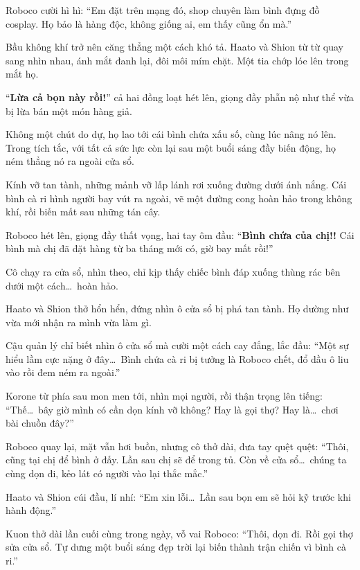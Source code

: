 \documentclass[../main.tex]{subfiles}
\begin{document}
Roboco cười hì hì: ``Em đặt trên mạng đó, shop chuyên làm bình đựng đồ cosplay. Họ bảo là hàng độc, không giống ai, em thấy cũng ổn mà.''

Bầu không khí trở nên căng thẳng một cách khó tả. Haato và Shion từ từ quay sang nhìn nhau, ánh mắt đanh lại, đôi môi mím chặt. Một tia chớp lóe lên trong mắt họ.

``\textbf{Lừa cả bọn này rồi!}''  cả hai đồng loạt hét lên, giọng đầy phẫn nộ như thể vừa bị lừa bán một món hàng giả.

Không một chút do dự, họ lao tới cái bình chứa xấu số, cùng lúc nâng nó lên. Trong tích tắc, với tất cả sức lực còn lại sau một buổi sáng đầy biến động, họ ném thẳng nó ra ngoài cửa sổ.


Kính vỡ tan tành, những mảnh vỡ lấp lánh rơi xuống đường dưới ánh nắng. Cái bình cà ri hình người bay vút ra ngoài, vẽ một đường cong hoàn hảo trong không khí, rồi biến mất sau những tán cây.

Roboco hét lên, giọng đầy thất vọng, hai tay ôm đầu: ``\textbf{Bình chứa của chị!!} Cái bình mà chị đã đặt hàng từ ba tháng mới có, giờ bay mất rồi!''

Cô chạy ra cửa sổ, nhìn theo, chỉ kịp thấy chiếc bình đáp xuống thùng rác bên dưới một cách\dots\ hoàn hảo.

Haato và Shion thở hổn hển, đứng nhìn ô cửa sổ bị phá tan tành. Họ dường như vừa mới nhận ra mình vừa làm gì.

Cậu quản lý chỉ biết nhìn ô cửa sổ mà cười một cách cay đắng, lắc đầu: ``Một sự hiểu lầm cực nặng ở đây\dots\ Bình chứa cà ri bị tưởng là Roboco chết, đổ dầu ô liu vào rồi đem ném ra ngoài.''

Korone từ phía sau mon men tới, nhìn mọi người, rồi thận trọng lên tiếng: ``Thế\dots\ bây giờ mình có cần dọn kính vỡ không? Hay là gọi thợ? Hay là\dots\ chơi bài chuồn đây?''

Roboco quay lại, mặt vẫn hơi buồn, nhưng cô thở dài, đưa tay quệt quệt: ``Thôi, cũng tại chị để bình ở đấy. Lần sau chị sẽ để trong tủ. Còn về cửa sổ\dots\ chúng ta cùng dọn đi, kẻo lát có người vào lại thắc mắc.''

Haato và Shion cúi đầu, lí nhí: ``Em xin lỗi\dots\ Lần sau bọn em sẽ hỏi kỹ trước khi hành động.''

Kuon thở dài lần cuối cùng trong ngày, vỗ vai Roboco: ``Thôi, dọn đi. Rồi gọi thợ sửa cửa sổ. Tự dưng một buổi sáng đẹp trời lại biến thành trận chiến vì bình cà ri.''
\end{document}
